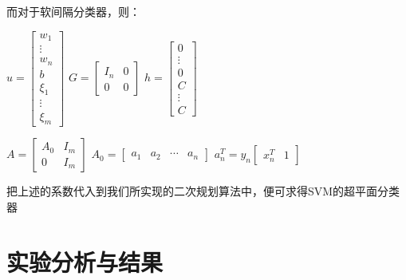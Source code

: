 \documentclass[12pt]{article}
\begin{document}
         而对于软间隔分类器，则：
         
         \begin{center}
         	
         	$u = \begin{bmatrix}
         	w_1 \\ \vdots \\ w_n \\ b \\ \xi_1 \\ \vdots \\ \xi_m
         	\end{bmatrix}$ \qquad
         	$G = \begin{bmatrix}
         	I_n & 0 \\ 0 & 0 
         	\end{bmatrix}$ \qquad
         	$h = \begin{bmatrix}
         	0 \\ \vdots \\ 0 \\ C \\ \vdots \\ C
         	\end{bmatrix}$
         \end{center}
         
         \begin{center}
         	
         	$A = \begin{bmatrix}
         	A_0 & I_m \\ 0 & I_m
         	\end{bmatrix}$ \qquad
         	$A_0 = \begin{bmatrix}
         	a_1 & a_2 & \cdots & a_n 
         	\end{bmatrix} $ \qquad
         	$a_n^T = y_n\begin{bmatrix}
         	x_n^T & 1
         	\end{bmatrix}$
         \end{center}
         
         把上述的系数代入到我们所实现的二次规划算法中，便可求得SVM的超平面分类器
    
    \vspace{30pt}
    
	\section{实验分析与结果}
	    \vspace{15pt}
\end{document}
